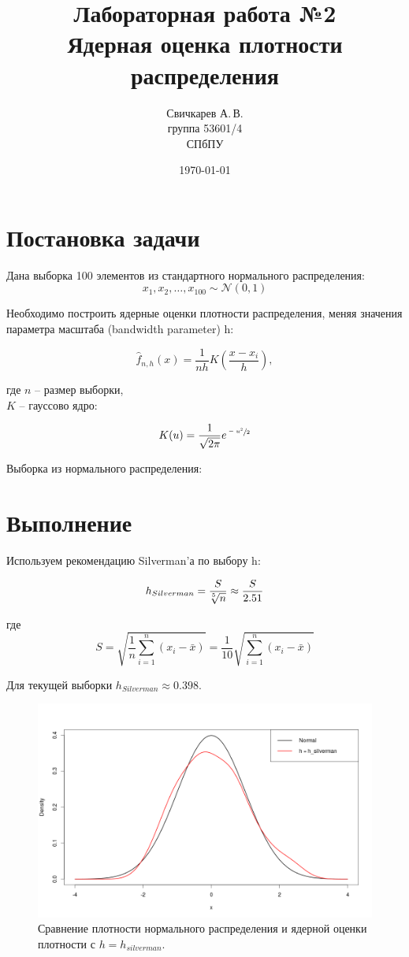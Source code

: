 \documentclass{article} %
\title{Лабораторная работа №2\\Ядерная оценка плотности распределения} %
\author{Свичкарев А.\,В.\\группа 53601/4\\СПбПУ} %
\date{\today} %
\begin{document}

\maketitle %

\section{Постановка задачи}
Дана выборка 100 элементов из стандартного нормального \mbox{распределения}:
\[x_1,x_2,\dotsc,x_{100}\sim\mathcal{N}(0,1)\]

Необходимо построить ядерные оценки плотности распределения, меняя значения параметра масштаба (bandwidth parameter) h:

\[\hat{f}_{n,h}(x) = \frac{1}{nh}K{\left(\frac{x-x_i}{h}\right)},\]

где $n$ -- размер выборки,\\
\indent $K$ -- гауссово ядро:

\[K(u) = \frac{1}{\sqrt{2\pi}}e^{\sfrac{-u^2}{2}}\]

Выборка из нормального распределения:
\\\newline



\newpage
\section{Выполнение}
Используем рекомендацию Silverman'а по выбору h:

\[h_{Silverman} = \frac{S}{\sqrt[\leftroot{2}\uproot{2}5]{n}} \approx \frac{S}{2.51}\]

где \[S = \sqrt{\frac{1}{n}\sum_{i=1}^{n} (x_i-\bar{x})} = \frac{1}{10}\sqrt{\sum_{i=1}^{n}(x_i-\bar{x})}\]

Для текущей выборки $h_{Silverman} \approx 0.398$.

\begin{figure}[H]
    \captionsetup{justification=centering}
    \includegraphics[width=\textwidth]{plot1}
    \caption{Сравнение плотности нормального распределения и ядерной оценки плотности с $h = h_{silverman}$.}
\end{figure}
\end{document}
